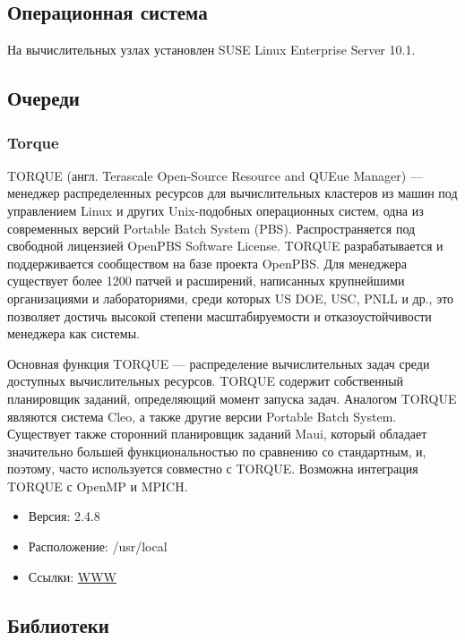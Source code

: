 \documentclass[a4paper,8pt]{extreport}
\begin{document}
\subsection{Операционная система}
На вычислительных узлах установлен SUSE Linux Enterprise Server 10.1.

\subsection{Очереди}
\subsubsection{Torque}
TORQUE (англ. Terascale Open-Source Resource and QUEue Manager) — менеджер распределенных ресурсов для 
вычислительных кластеров из машин под управлением Linux и других Unix-подобных операционных систем, 
одна из современных версий Portable Batch System (PBS). Распространяется под свободной лицензией 
OpenPBS Software License. TORQUE разрабатывается и поддерживается сообществом на базе проекта OpenPBS. 
Для менеджера существует более 1200 патчей и расширений, написанных крупнейшими организациями и лабораториями, 
среди которых US DOE, USC, PNLL и др., это позволяет достичь высокой степени масштабируемости и 
отказоустойчивости менеджера как системы.

Основная функция TORQUE — распределение вычислительных задач среди доступных вычислительных ресурсов. 
TORQUE содержит собственный планировщик заданий, определяющий момент запуска задач. Аналогом TORQUE являются 
система Cleo, а также другие версии Portable Batch System. Существует также сторонний планировщик заданий Maui, 
который обладает значительно большей функциональностью по сравнению со стандартным, и, поэтому, часто 
используется совместно с TORQUE. Возможна интеграция TORQUE с OpenMP и MPICH.
\begin{itemize}
 \item Версия: 2.4.8
 \item Расположение: /usr/local
 \item Ссылки: \href{http://www.clusterresources.com/products/torque-resource-manager.php}{WWW}
\end{itemize}

\subsection{Библиотеки}
\end{document}
